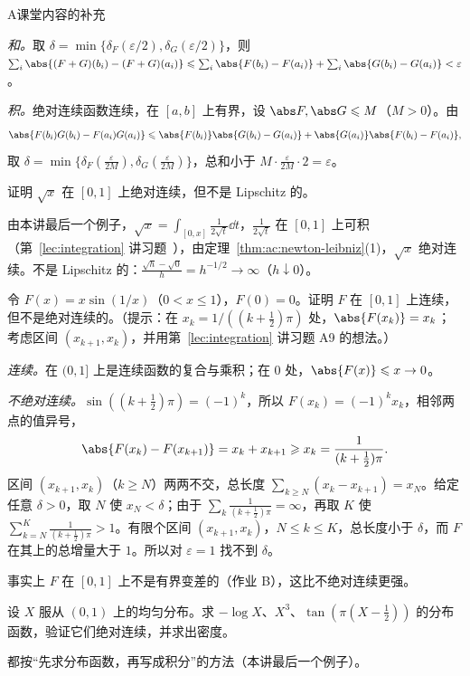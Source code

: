 \begin{exercises}{A}{课堂内容的补充}
\begin{questions}
\begin{solution}
\emph{和。}取 $\delta=\min\{\delta_F(\varepsilon/2),\delta_G(\varepsilon/2)\}$，则 $\sum_i\abs{(F+G)(b_i)-(F+G)(a_i)}\leqslant\sum_i\abs{F(b_i)-F(a_i)}+\sum_i\abs{G(b_i)-G(a_i)}<\varepsilon$。

\emph{积。}绝对连续函数连续，在 $[a,b]$ 上有界，设 $\abs F,\abs G\leqslant M$（$M>0$）。由
\[
\abs{F(b_i)G(b_i)-F(a_i)G(a_i)}\leqslant\abs{F(b_i)}\abs{G(b_i)-G(a_i)}+\abs{G(a_i)}\abs{F(b_i)-F(a_i)},
\]
取 $\delta=\min\{\delta_F(\frac\varepsilon{2M}),\delta_G(\frac\varepsilon{2M})\}$，总和小于 $M\cdot\frac\varepsilon{2M}\cdot2=\varepsilon$。
\end{solution}
\item 证明 $\sqrt x$ 在 $[0,1]$ 上绝对连续，但不是 Lipschitz 的。
\begin{solution}
由本讲最后一个例子，$\sqrt x=\int_{[0,x]}\frac1{2\sqrt t}\dd t$，$\frac1{2\sqrt t}$ 在 $[0,1]$ 上可积（第~\ref{lec:integration} 讲习题~），由定理~\ref{thm:ac:newton-leibniz}(1)，$\sqrt x$ 绝对连续。不是 Lipschitz 的：$\frac{\sqrt h-\sqrt0}{h}=h^{-1/2}\to\infty$（$h\downarrow0$）。
\end{solution}
\end{questions}

\item\label{ex:ac:A9} 令 $F(x)=x\sin(1/x)$（$0<x\leqslant1$），$F(0)=0$。证明 $F$ 在 $[0,1]$ 上连续，但不是绝对连续的。（提示：在 $x_k=1/((k+\frac12)\pi)$ 处，$\abs{F(x_k)}=x_k$；考虑区间 $(x_{k+1},x_k)$，并用第~\ref{lec:integration} 讲习题 A9 的想法。）
\begin{solution}
\emph{连续。}在 $(0,1]$ 上是连续函数的复合与乘积；在 $0$ 处，$\abs{F(x)}\leqslant x\to0$。

\emph{不绝对连续。}$\sin((k+\frac12)\pi)=(-1)^k$，所以 $F(x_k)=(-1)^kx_k$，相邻两点的值异号，
\[
\abs{F(x_k)-F(x_{k+1})}=x_k+x_{k+1}\geqslant x_k=\frac1{(k+\frac12)\pi}.
\]
区间 $(x_{k+1},x_k)$（$k\geqslant N$）两两不交，总长度 $\sum_{k\geqslant N}(x_k-x_{k+1})=x_N$。给定任意 $\delta>0$，取 $N$ 使 $x_N<\delta$；由于 $\sum_k\frac1{(k+\frac12)\pi}=\infty$，再取 $K$ 使 $\sum_{k=N}^K\frac1{(k+\frac12)\pi}>1$。有限个区间 $(x_{k+1},x_k)$，$N\leqslant k\leqslant K$，总长度小于 $\delta$，而 $F$ 在其上的总增量大于 $1$。所以对 $\varepsilon=1$ 找不到 $\delta$。

事实上 $F$ 在 $[0,1]$ 上不是有界变差的（作业 B），这比不绝对连续更强。
\end{solution}

\item\label{ex:ac:A10} 设 $X$ 服从 $(0,1)$ 上的均匀分布。求 $-\log X$、$X^3$、$\tan(\pi(X-\frac12))$ 的分布函数，验证它们绝对连续，并求出密度。
\begin{solution}
都按“先求分布函数，再写成积分”的方法（本讲最后一个例子）。


\end{solution}
\end{exercises}
